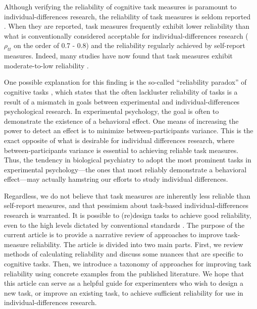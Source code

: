 \documentclass[a4paper,notitlepage,12pt]{article}
\begin{document}

Although verifying the reliability of cognitive task measures is paramount to individual-differences research, the reliability of task measures is seldom reported \cite{Green2016-xw, Parsons2019-jw}. When they are reported, task measures frequently exhibit lower reliability than what is conventionally considered acceptable for individual-differences research ($\rho_{tt}$ on the order of 0.7 - 0.8) and the reliability regularly achieved by self-report measures. Indeed, many studies have now found that task measures exhibit moderate-to-low reliability \cite{Hedge2018-lf, Frey2017-uz, Enkavi2019-oh, Von_Bastian2020-tm, Nitsch2022-pe, verdejo2021unified}.

One possible explanation for this finding is the so-called ``reliability paradox'' of cognitive tasks \cite{Hedge2018-lf}, which states that the often lackluster reliability of tasks is a result of a mismatch in goals between experimental and individual-differences psychological research. In experimental psychology, the goal is often to demonstrate the existence of a behavioral effect. One means of increasing the power to detect an effect is to minimize between-participants variance. This is the exact opposite of what is desirable for individual differences research, where between-participants variance is essential to achieving reliable task measures. Thus, the tendency in biological psychiatry to adopt the most prominent tasks in experimental psychology---the ones that most reliably demonstrate a behavioral effect---may actually hamstring our efforts to study individual differences. 


Regardless, we do not believe that task measures are inherently less reliable than self-report measures, and that pessimism about task-based individual-differences research is warranted. It is possible to (re)design tasks to achieve good reliability, even to the high levels dictated by conventional standards \cite{waltmann2022sufficient, sullivan2022enhancing, kucina2022solution, snijder2022psychometric}. The purpose of the current article is to provide a narrative review of approaches to improve task-measure reliability. The article is divided into two main parts. First, we review methods of calculating reliability and discuss some nuances that are specific to cognitive tasks. Then, we introduce a taxonomy of approaches for improving task reliability using concrete examples from the published literature. We hope that this article can serve as a helpful guide for experimenters who wish to design a new task, or improve an existing task, to achieve sufficient reliability for use in individual-differences research.
\end{document}
